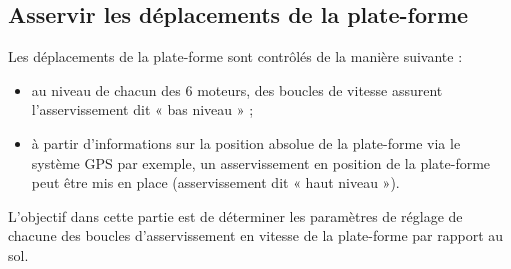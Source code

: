 \subsection{Asservir les déplacements de la plate-forme}
Les déplacements de la plate-forme sont contrôlés de la manière suivante :
\begin{itemize}
\item au niveau de chacun des 6 moteurs, des boucles de vitesse assurent l’asservissement dit « bas niveau » ;
\item à partir d’informations sur la position absolue de la plate-forme via le système GPS par exemple, un asservissement en position de la plate-forme peut être mis en place (asservissement dit « haut niveau »).
\end{itemize}
L’objectif dans cette partie est de déterminer les paramètres de réglage de chacune des boucles d’asservissement en vitesse de la plate-forme par rapport au sol.

